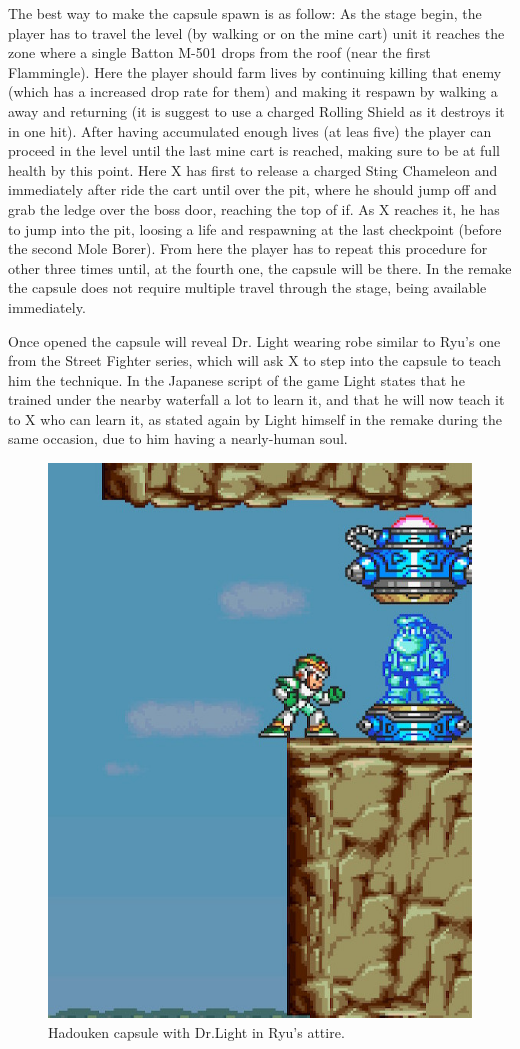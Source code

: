 The best way to make the capsule spawn is as follow: As the stage begin, the player has to travel the level (by walking or on the mine cart) unit it reaches the zone where a single Batton M-501 drops from the roof (near the first Flammingle). Here the player should farm lives by continuing killing that enemy (which has a increased drop rate for them)  and making it respawn by walking a away and returning (it is suggest to use a charged Rolling Shield as it destroys it in one hit). After having accumulated enough lives (at leas five) the player can proceed in the level until the last mine cart is reached, making sure to be at full health by this point. Here X has first to release a charged Sting Chameleon and immediately after ride the cart until over the pit, where he should jump off and grab the ledge over the boss door, reaching the top of if. As X reaches it, he has to jump into the pit, loosing a life and respawning at the last checkpoint (before the second Mole Borer). From here the player has to repeat this procedure for other three times until, at the  fourth one, the capsule will be there. In the remake the capsule does not require multiple travel through the stage, being available immediately.

Once opened the capsule will reveal Dr. Light wearing robe similar to Ryu's one from the Street Fighter series, which will ask X to step into the capsule to teach him the technique. In the Japanese  script of the game\cite{wordpress:X_japanese_script} Light states that he trained under the nearby waterfall a lot to learn it, and that he will now teach it to X who can learn it, as stated again by Light himself in the \mhx remake during the same occasion, due to him having a nearly-human soul.

\begin{figure}[htp]
	\centering
	\includegraphics[width=0.3\linewidth]{figures/X1/Armored_armadillo/Armadillo_hadouken.jpg}
	\caption{Hadouken capsule with Dr.Light in Ryu's attire.}
\end{figure}

